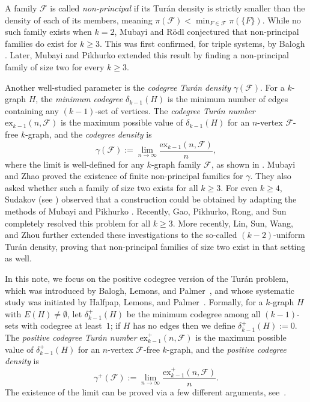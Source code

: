 \documentclass[11pt]{article}
\begin{document}
A family $\mathcal{F}$ is called \textit{non-principal} if its Tur\'an density is strictly smaller than the density of each of its members, meaning $\pi(\mathcal{F}) < \min_{F \in \mathcal{F}} \pi(\{F\})$. While no such family exists when $k=2$, Mubayi and R\"odl \cite{MR02} conjectured that non-principal families do exist for $k \geq 3$. This was first confirmed, for triple systems, by Balogh \cite{B02}. Later, Mubayi and Pikhurko \cite{MP08} extended this result by finding a non-principal family of size two for every $k \geq 3$.

Another well-studied parameter is the \textit{codegree Tur\'an density} $\gamma(\mathcal{F})$. For a $k$-graph $H$, the \emph{minimum codegree} $\delta_{k-1}(H)$ is the minimum number of edges containing any $(k-1)$-set of vertices. The \emph{codegree Tur\'an number} $\text{ex}_{k-1}(n, \mathcal{F})$ is the maximum possible value of $\delta_{k-1}(H)$ for an $n$-vertex $\mathcal{F}$-free $k$-graph, and the \emph{codegree density} is 
\[
\gamma(\mathcal{F}) := \lim_{n \to \infty} \frac{\text{ex}_{k-1}(n, \mathcal{F})}{n},
\]
where the limit is well-defined for any $k$-graph family $\mathcal{F}$, as shown in \cite[Proposition 1.2]{MubayiZhao07}. 
Mubayi and Zhao \cite{MubayiZhao07} proved the existence of finite non-principal families for $\gamma$. They also asked whether such a family of size two exists for all $k \ge 3$. For even $k \ge 4$, Sudakov (see \cite[Page 1131]{MubayiZhao07}) observed that a construction could be obtained by adapting the methods of Mubayi and Pikhurko \cite{MP08}. Recently, Gao, Pikhurko, Rong, and Sun \cite{GPRS2026rational} completely resolved this problem for all $k \ge 3$. More recently, Lin, Sun, Wang, and Zhou \cite{LSWZ26} further extended these investigations to the so-called $(k-2)$-uniform Tur\'an density, proving that non-principal families of size two exist in that setting as well.

In this note, we focus on the positive codegree version of the Tur\'an problem, which was introduced by Balogh, Lemons, and Palmer~\cite{BLP21}, and whose systematic study was initiated by 
Halfpap, Lemons, and Palmer~\cite{HLP25}. 
Formally, for a $k$-graph $H$ with $E(H)\not=\emptyset$, let $\delta^+_{k-1}(H)$ be the minimum codegree among all $(k-1)$-sets with codegree at least~$1$; if $H$ has no edges then we define $\delta^+_{k-1}(H):=0$. The \emph{positive codegree Tur\'an number} $\text{ex}^+_{k-1}(n, \mathcal{F})$ is the maximum possible value of $\delta^+_{k-1}(H)$ for an $n$-vertex $\mathcal{F}$-free $k$-graph, and the \emph{positive codegree density} is
\[
\gamma^+(\mathcal{F}) := \lim_{n \to \infty} \frac{\text{ex}^+_{k-1}(n, \mathcal{F})}{n}.
\]
The existence of the limit can be proved via a few different arguments, see~\cite{HLP25,P23On}. 
\end{document}
